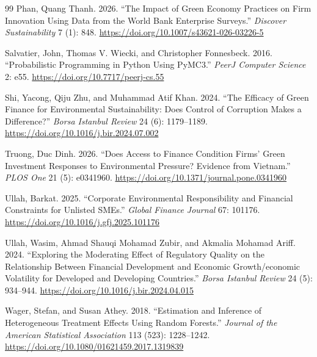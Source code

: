 \begin{thebibliography}{99}
Phan, Quang Thanh. 2026. ``The Impact of Green Economy Practices on Firm Innovation Using Data from the {World Bank Enterprise Surveys}.'' \emph{Discover Sustainability} 7 (1): 848. \url{https://doi.org/10.1007/s43621-026-03226-5}

Salvatier, John, Thomas V. Wiecki, and Christopher Fonnesbeck. 2016. ``Probabilistic Programming in {Python} Using {PyMC3}.'' \emph{PeerJ Computer Science} 2: e55. \url{https://doi.org/10.7717/peerj-cs.55}

Shi, Yacong, Qiju Zhu, and Muhammad Atif Khan. 2024. ``The Efficacy of Green Finance for Environmental Sustainability: Does Control of Corruption Makes a Difference?'' \emph{Borsa Istanbul Review} 24 (6): 1179--1189. \url{https://doi.org/10.1016/j.bir.2024.07.002}

Truong, Duc Dinh. 2026. ``Does Access to Finance Condition Firms' Green Investment Responses to Environmental Pressure? Evidence from {Vietnam}.'' \emph{PLOS One} 21 (5): e0341960. \url{https://doi.org/10.1371/journal.pone.0341960}

Ullah, Barkat. 2025. ``Corporate Environmental Responsibility and Financial Constraints for Unlisted {SMEs}.'' \emph{Global Finance Journal} 67: 101176. \url{https://doi.org/10.1016/j.gfj.2025.101176}

Ullah, Wasim, Ahmad Shauqi Mohamad Zubir, and Akmalia Mohamad Ariff. 2024. ``Exploring the Moderating Effect of Regulatory Quality on the Relationship Between Financial Development and Economic Growth/economic Volatility for Developed and Developing Countries.'' \emph{Borsa Istanbul Review} 24 (5): 934--944. \url{https://doi.org/10.1016/j.bir.2024.04.015}

Wager, Stefan, and Susan Athey. 2018. ``Estimation and Inference of Heterogeneous Treatment Effects Using Random Forests.'' \emph{Journal of the American Statistical Association} 113 (523): 1228--1242. \url{https://doi.org/10.1080/01621459.2017.1319839}

\end{thebibliography}
